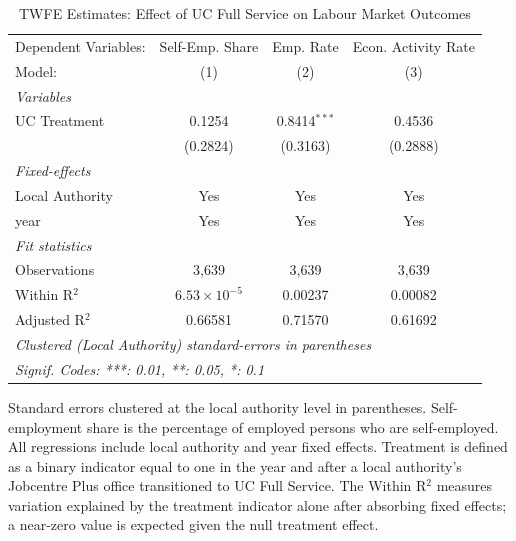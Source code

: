 
\begin{table}[htbp]
   \caption{\label{tab:twfe} TWFE Estimates: Effect of UC Full Service on Labour Market Outcomes}
   \centering
   \begin{tabular}{lccc}
      \tabularnewline \midrule \midrule
      Dependent Variables: & Self-Emp. Share       & Emp. Rate      & Econ. Activity Rate\\  
      Model:               & (1)                   & (2)            & (3)\\  
      \midrule
      \emph{Variables}\\
      UC Treatment         & 0.1254                & 0.8414$^{***}$ & 0.4536\\   
                           & (0.2824)              & (0.3163)       & (0.2888)\\   
      \midrule
      \emph{Fixed-effects}\\
      Local Authority      & Yes                   & Yes            & Yes\\  
      year                 & Yes                   & Yes            & Yes\\  
      \midrule
      \emph{Fit statistics}\\
      Observations         & 3,639                 & 3,639          & 3,639\\  
      Within R$^2$         & $6.53\times 10^{-5}$  & 0.00237        & 0.00082\\  
      Adjusted R$^2$       & 0.66581               & 0.71570        & 0.61692\\  
      \midrule \midrule
      \multicolumn{4}{l}{\emph{Clustered (Local Authority) standard-errors in parentheses}}\\
      \multicolumn{4}{l}{\emph{Signif. Codes: ***: 0.01, **: 0.05, *: 0.1}}\\
   \end{tabular}
   
   \par \raggedright 
   Standard errors clustered at the local authority level in parentheses. Self-employment share is the percentage of employed persons who are self-employed. All regressions include local authority and year fixed effects. Treatment is defined as a binary indicator equal to one in the year and after a local authority's Jobcentre Plus office transitioned to UC Full Service. The Within R$^2$ measures variation explained by the treatment indicator alone after absorbing fixed effects; a near-zero value is expected given the null treatment effect.
\end{table}


